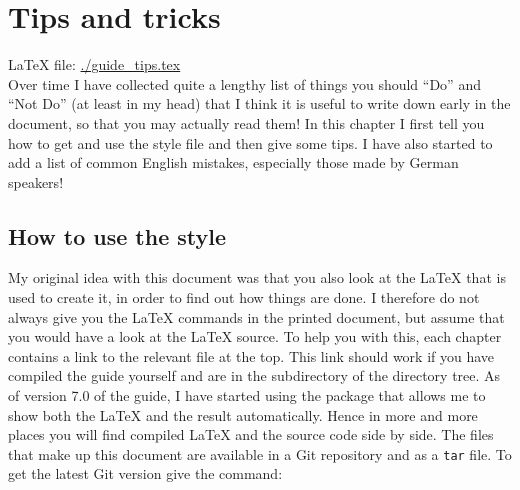 
\chapter{Tips and tricks}%
\label{sec:tips}

\LaTeX{} file: \url{./guide_tips.tex}\\[1ex]
\noindent
Over time I have collected quite a lengthy list of things you should
\enquote{Do} and \enquote{Not Do} (at least in my head) that I think
it is useful to write down early in the document, so that you may
actually read them!  In this chapter I first tell you how to get
and use the style file and then give some tips.
I have also started to add a list of common English mistakes,
especially those made by German speakers!

\section{How to use the  style}%
\label{sec:tips:howto}

My original idea with this document was that you also look at the \LaTeX{} that
is used to create it, in order to find out how things are done.
I therefore do not always give you the \LaTeX{} commands in the printed
document, but assume that you would have a look at the \LaTeX{} source.
To help you with this, each chapter contains a link to the relevant
file at the top. This link should work if you have compiled the guide
yourself and are in the  subdirectory of the
 directory tree.
As of version 7.0 of the guide,
I have started using the  package that allows me to show
both the \LaTeX{} and the result automatically.
Hence in more and more places you will find compiled \LaTeX{} and the source code side by side.
The files that make up this document are available in a Git repository and as a \texttt{tar} file.
To get the latest Git version give the command:

